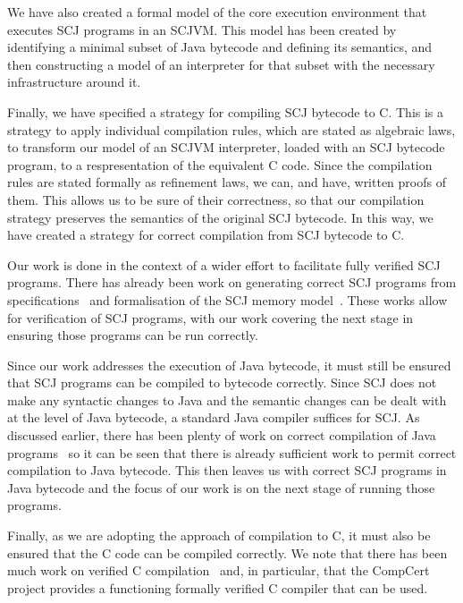 We have also created a formal model of the core execution environment
that executes SCJ programs in an SCJVM.
This model has been created by identifying a minimal subset of Java
bytecode and defining its semantics, and then constructing a \Circus{}
model of an interpreter for that subset with the necessary
infrastructure around it.

Finally, we have specified a strategy for compiling SCJ bytecode to C.
This is a strategy to apply individual compilation rules, which are
stated as algebraic laws, to transform our model of an SCJVM
interpreter, loaded with an SCJ bytecode program, to a \Circus{}
respresentation of the equivalent C code.
Since the compilation rules are stated formally as \Circus{}
refinement laws, we can, and have, written proofs of them.
This allows us to be sure of their correctness, so that our
compilation strategy preserves the semantics of the original SCJ
bytecode.
In this way, we have created a strategy for correct compilation from
SCJ bytecode to C.

Our work is done in the context of a wider effort to facilitate fully
verified SCJ programs.
There has already been work on generating correct SCJ programs from
\Circus{} specifications~\cite{cavalcanti2011, cavalcanti2013} and
formalisation of the SCJ memory model~\cite{cavalcanti2011a}.
These works allow for verification of SCJ programs, with our work
covering the next stage in ensuring those programs can be run
correctly.

Since our work addresses the execution of Java bytecode, it must still
be ensured that SCJ programs can be compiled to bytecode correctly.
Since SCJ does not make any syntactic changes to Java and the
semantic changes can be dealt with at the level of Java bytecode, a
standard Java compiler suffices for SCJ.
As discussed earlier, there has been plenty of work on correct
compilation of Java programs~\cite{klein2006, strecker2002,
  lochbihler2010, duran2005, stark2001} so it can be seen that there
is already sufficient work to permit correct compilation to Java
bytecode.
This then leaves us with correct SCJ programs in Java bytecode and the
focus of our work is on the next stage of running those programs.

Finally, as we are adopting the approach of compilation to C, it must
also be ensured that the C code can be compiled correctly.
We note that there has been much work on verified C
compilation~\cite{leroy2009a, leroy2009b, leroy2012, leinenbach2005,
  blazy2006} and, in particular, that the CompCert project provides a
functioning formally verified C compiler that can be used.

